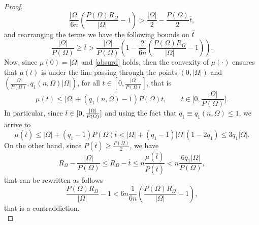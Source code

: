\documentclass[oneside,a4paper,11pt,notitlepage]{article}
\newcommand{\abs}[1]{{\left|#1\right|}}
\theoremstyle{definition}
\theoremstyle{plain}
\theoremstyle{definition}
\begin{document}
\begin{proof}
$$\frac{\abs{\Omega}}{6n}\left(\frac{P(\Omega)R_\Omega}{|\Omega|}-1\right)> \frac{\abs{\Omega}}{2}-\frac{P(\Omega)}{2}\overline{t},$$
and rearranging the terms we have the following bounds on $\Bar{t}$
$$\frac{\abs{\Omega}}{P(\Omega)}\ge \overline{t}> \frac{\abs{\Omega}}{P(\Omega)}\left(1-\frac{2}{6n}\left(\frac{P(\Omega)R_\Omega}{\abs{\Omega}}-1\right)\right).$$
Now, since $\mu(0)=\abs{\Omega}$ and \eqref{absurd} holds, then the convexity  of $\mu(\cdot)$ ensures that $\mu(t)$ is under the line passing through the points $(0,\abs{\Omega})$ and $(\frac{\abs{\Omega}}{P(\Omega)},q_1(n,\Omega)\abs{\Omega})$, for all $t \in [0,\frac{\abs{\Omega}}{P(\Omega)}]$, that is 
\begin{equation*}
    \mu(t) \le \abs{\Omega}+(q_1(n,\Omega)-1)P(\Omega)t, \qquad t\in \bigg[0,\frac{\abs{\Omega}}{P(\Omega)}\bigg].
\end{equation*}In particular, since $\Bar{t}\in [0,\frac{\abs{\Omega}}{P(\Omega)}]$ and using the fact that $q_1\equiv q_1(n,\Omega)\le 1$, we arrive to
$$\mu(\overline{t})\le \abs{\Omega}+ (q_1-1)P(\Omega)\overline{t}<\abs{\Omega}+ (q_1-1)|\Omega|(1-2q_1)\le 3q_1 \abs{\Omega}. $$
On the other hand, since $P(\overline{t}) \geq \frac{P(\Omega)}{2}$, we have
\begin{equation*}
    R_{\Omega} - \frac{\abs{\Omega}}{P(\Omega)} \leq  R_{\Omega} - \overline{t} \leq n \frac{\mu(\overline{t})}{P(\overline{t})} < n \frac{6q_1\abs{\Omega}}{P(\Omega)},
\end{equation*}
that can be rewritten as follows
$$
 \frac{P(\Omega) R_\Omega}{\abs{\Omega}}-1 < 6n \frac{1}{6n} \left(\frac{P(\Omega) R_\Omega}{\abs{\Omega}}-1\right),
$$
that is a contraddiction.\\

\end{proof}
\end{document}

